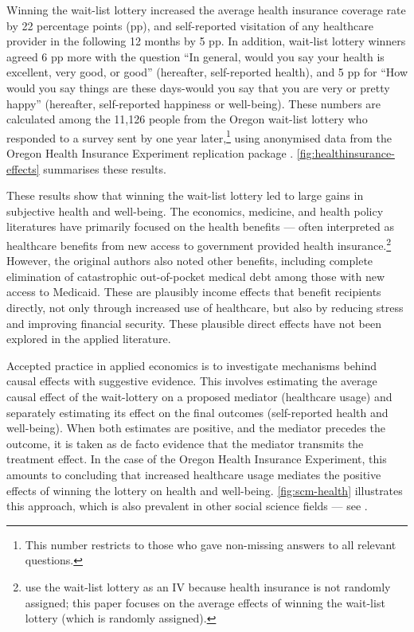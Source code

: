 Winning the wait-list lottery increased the average health insurance coverage rate by 22 percentage points (pp), and self-reported visitation of any healthcare provider in the following 12 months by 5 pp.
In addition, wait-list lottery winners agreed 6 pp more with the question ``In general, would you say your health is excellent, very good, or good'' (hereafter, self-reported health),
and 5 pp for ``How would you say things are these days-would you say that you are very  or pretty happy'' (hereafter, self-reported happiness or well-being).
These numbers are calculated among the 11,126
%
people from the Oregon wait-list lottery who responded to a survey sent by \cite{finkelstein2008oregon} one year later,\footnote{
    This number restricts to those who gave non-missing answers to all relevant questions.
}
using anonymised data from the Oregon Health Insurance Experiment replication package \citep{icspr2014oregon}.
\autoref{fig:healthinsurance-effects} summarises these results.

These results show that winning the wait-list lottery led to large gains in subjective health and well-being.
The economics, medicine, and health policy literatures have primarily focused on the health benefits --- often interpreted as healthcare benefits from new access to government provided health insurance.\footnote{
    \cite{finkelstein2008oregon} use the wait-list lottery as an IV because health insurance is not randomly assigned; this paper focuses on the average effects of winning the wait-list lottery (which is randomly assigned).
}
However, the original authors also noted other benefits, including complete elimination of catastrophic out-of-pocket medical debt among those with new access to Medicaid.
These are plausibly income effects that benefit recipients directly, not only through increased use of healthcare, but also by reducing stress and improving financial security.
These plausible direct effects have not been explored in the applied literature.

Accepted practice in applied economics is to investigate mechanisms behind causal effects with suggestive evidence.
This involves estimating the average causal effect of the wait-lottery on a proposed mediator (healthcare usage) and separately estimating its effect on the final outcomes (self-reported health and well-being).
When both estimates are positive, and the mediator precedes the outcome, it is taken as de facto evidence that the mediator transmits the treatment effect.
In the case of the Oregon Health Insurance Experiment, this amounts to concluding that increased healthcare usage mediates the positive effects of winning the lottery on health and well-being.
\autoref{fig:scm-health} illustrates this approach, which is also prevalent in other social science fields --- see \cite{blackwell2024assumption,green2010enough}.

